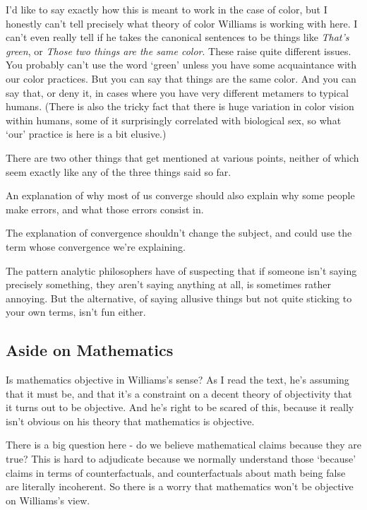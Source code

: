 \documentclass[
]{article}
\providecommand{\tightlist}{%
  \setlength{\itemsep}{0pt}\setlength{\parskip}{0pt}}
\begin{document}
I'd like to say exactly how this is meant to work in the case of color,
but I honestly can't tell precisely what theory of color Williams is
working with here. I can't even really tell if he takes the canonical
sentences to be things like \emph{That's green}, or \emph{Those two
things are the same color}. These raise quite different issues. You
probably can't use the word `green' unless you have some acquaintance
with our color practices. But you can say that things are the same
color. And you can say that, or deny it, in cases where you have very
different metamers to typical humans. (There is also the tricky fact
that there is huge variation in color vision within humans, some of it
surprisingly correlated with biological sex, so what `our' practice is
here is a bit elusive.)

There are two other things that get mentioned at various points, neither
of which seem exactly like any of the three things said so far.

\begin{description}
\tightlist
\item[Explanation of Error]
An explanation of why most of us converge should also explain why some
people make errors, and what those errors consist in.
\item[Repeating Term in Explanation]
The explanation of convergence shouldn't change the subject, and could
use the term whose convergence we're explaining.
\end{description}

The pattern analytic philosophers have of suspecting that if someone
isn't saying precisely something, they aren't saying anything at all, is
sometimes rather annoying. But the alternative, of saying allusive
things but not quite sticking to your own terms, isn't fun either.

\hypertarget{aside-on-mathematics}{%
\subsection{Aside on Mathematics}\label{aside-on-mathematics}}

Is mathematics objective in Williams's sense? As I read the text, he's
assuming that it must be, and that it's a constraint on a decent theory
of objectivity that it turns out to be objective. And he's right to be
scared of this, because it really isn't obvious on his theory that
mathematics is objective.

There is a big question here - do we believe mathematical claims because
they are true? This is hard to adjudicate because we normally understand
those `because' claims in terms of counterfactuals, and counterfactuals
about math being false are literally incoherent. So there is a worry
that mathematics won't be objective on Williams's view.
\end{document}
